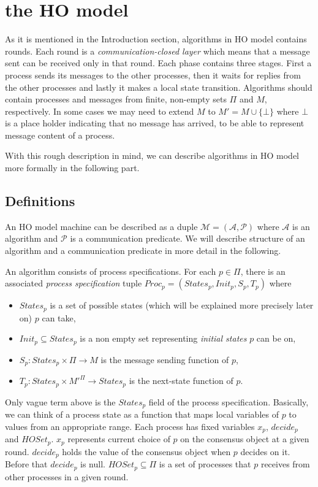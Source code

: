 \documentclass{llncs}
\begin{document}
\section{the HO model}
As it is mentioned in the Introduction section, algorithms in HO model contains rounds. Each round is a \emph{communication-closed layer} which means that a message sent can be received only in that round. Each phase contains three stages. First a process sends its messages to the other processes, then it waits for replies from the other processes and lastly it makes a local state transition. Algorithms should contain processes and messages from finite, non-empty sets $\Pi$ and $M$, respectively. In some cases we may need to extend $M$ to $M' = M \cup \{\bot\}$ where $\bot$ is a place holder indicating that no message has arrived, to be able to represent message content of a process.

With this rough description in mind, we can describe algorithms in HO model more formally in the following part.

\subsection{Definitions}
An HO model machine can be described as a duple $\mathcal{M} = (\mathcal{A}, \mathcal{P})$ where $\mathcal{A}$ is an algorithm and $\mathcal{P}$ is a communication predicate. We will describe structure of an algorithm and a communication predicate in more detail in the following.

An algorithm consists of process specifications. For each $p \in \Pi$, there is an associated \emph{process specification} tuple $Proc_p = (States_p, Init_p, S_p, T_p)$ where
\begin{itemize}
\item $States_p$ is a set of possible states (which will be explained more precisely later on) $p$ can take,
\item $Init_p \subseteq States_p$ is a non empty set representing \emph{initial states} $p$ can be on,
\item $S_p : States_p \times \Pi \rightarrow M$ is the message sending function of $p$,
\item $T_p: States_p \times M'^\Pi \rightarrow States_p$ is the next-state function of $p$.
\end{itemize}

Only vague term above is the $States_p$ field of the process specification. Basically, we can think of a process state as a function that maps local variables of $p$ to values from an appropriate range. Each process has fixed variables $x_p$, $decide_p$ and $HOSet_p$. $x_p$ represents current choice of $p$ on the consensus object at a given round. $decide_p$ holds the value of the consensus object when $p$ decides on it. Before that $decide_p$ is null. $HOSet_p \subseteq \Pi$ is a set of processes that $p$ receives from other processes in a given round.
\end{document}
